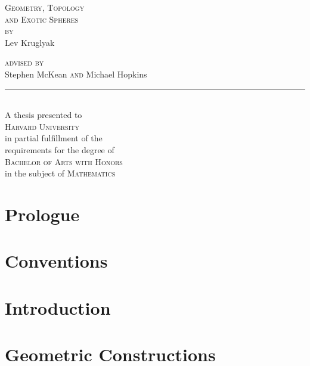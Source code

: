 \documentclass{lkx_thesis}
\begin{document}
\begin{titlepage}
	\begin{center}
		\vfill
		{\HUGE\scshape Geometry, Topology\\ and Exotic Spheres}\\[4em]

		{\Large \scshape by}\\[2em]
		{\huge Lev Kruglyak}\\[3in]

		{
		\Large
		{\scshape advised by\\[1em]}
		{Stephen McKean}
		{\scshape  and}
		{Michael Hopkins}\\[1em]
    \noindent\rule{1in}{0.6pt}\\[1em]
		A thesis presented to \\[1em]
		\textsc{Harvard University}\\[1em]
		in partial fulfillment of the \\
		requirements for the degree of\\[1em]

		\textsc{Bachelor of Arts with Honors}\\
		in the subject of \textsc{Mathematics}
		}
		\vfill
	\end{center}
\end{titlepage}

\lkxtoc

\chapter*{Prologue}\label{chap:prologue}


\chapter*{Conventions}\label{chap:conventions}


\chapter{Introduction}\label{chap:introduction}


\chapter{Geometric Constructions}\label{chap:construction}

\end{document}
